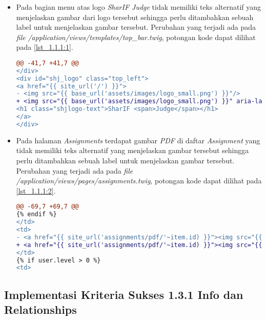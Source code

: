 \begin{itemize}
	\item Pada bagian menu atas logo \textit{SharIF Judge} tidak memiliki teks alternatif yang menjelaskan gambar dari logo tersebut sehingga perlu ditambahkan sebuah label untuk menjelaskan gambar tersebut. Perubahan yang terjadi ada pada \textit{file} \textit{/application/views/templates/top\_bar.twig}, potongan kode dapat dilihat pada \ref{lst_1.1.1:1}.
	
\begin{lstlisting}[language=diff, caption=Perubahan pada \textit{file} \textit{top\_bar.twig}, label=lst_1.1.1:1, basicstyle=\ttfamily, frame=single,
columns=fullflexible, keepspaces=true, breaklines=true]
@@ -41,7 +41,7 @@
</div>
<div id="shj_logo" class="top_left">
<a href="{{ site_url('/') }}">
- <img src="{{ base_url('assets/images/logo_small.png') }}"/>
+ <img src="{{ base_url('assets/images/logo_small.png') }}" aria-label="Logo SharIF Judge"/>
<h1 class="shjlogo-text">SharIF <span>Judge</span></h1>
</a>
</div>
\end{lstlisting}

	\item Pada halaman \textit{Assignments} terdapat gambar \textit{PDF} di daftar \textit{Assignment} yang tidak memiliki teks alternatif yang menjelaskan gambar tersebut sehingga perlu ditambahkan sebuah label untuk menjelaskan gambar tersebut. Perubahan yang terjadi ada pada \textit{file} \textit{/application/views/pages/assignments.twig}, potongan kode dapat dilihat pada \ref{lst_1.1.1:2}.
	
\begin{lstlisting}[language=diff, caption=Perubahan pada \textit{file} \textit{assignments.twig}, label=lst_1.1.1:2, basicstyle=\ttfamily, frame=single,
columns=fullflexible, keepspaces=true, breaklines=true]
@@ -69,7 +69,7 @@
{% endif %}
</td>
<td>
- <a href="{{ site_url('assignments/pdf/'~item.id) }}"><img src="{{ base_url('assets/images/pdf.svg') }}" /></a>
+ <a href="{{ site_url('assignments/pdf/'~item.id) }}"><img src="{{ base_url('assets/images/pdf.svg') }}" aria-label="Download PDF For Assignment {{ item.name }}"/></a>
</td>
{% if user.level > 0 %}
<td>
\end{lstlisting}
\end{itemize}

\subsection{Implementasi Kriteria Sukses 1.3.1 Info dan Relationships}
\label{subsec:implementasi_A_1.3.1}

